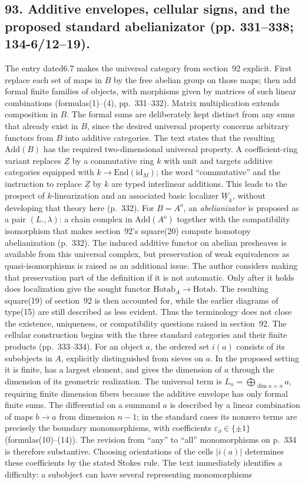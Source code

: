 \documentclass[10pt,oneside]{book}
\begin{document}
\subsection*{93. Additive envelopes, cellular signs, and the proposed standard abelianizator (pp. 331--338; 134-6/12--19).}
The entry dated6.7 makes the universal category from section~92 explicit. First replace each set of maps in $B$ by the free abelian group on those maps; then add formal finite families of objects, with morphisms given by matrices of such linear combinations (formulas(1)--(4), pp.~331--332). Matrix multiplication extends composition in $B$. The formal sums are deliberately kept distinct from any sums that already exist in $B$, since the desired universal property concerns arbitrary functors from $B$ into additive categories. The text states that the resulting $\mathrm{Add}(B)$ has the required two-dimensional universal property. A coefficient-ring variant replaces $\underline Z$ by a commutative ring $k$ with unit and targets additive categories equipped with $k\to\mathrm{End}(\mathrm{id}_M)$; the word ``commutative'' and the instruction to replace $\underline Z$ by $k$ are typed interlinear additions. This leads to the prospect of $k$-linearization and an associated basic localizer $\underline W_k$, without developing that theory here (p.~332). For $B=A^o$, an \emph{abelianizator} is proposed as a pair $(L.,\lambda)$: a chain complex in $\mathrm{Add}(A^o)$ together with the compatibility isomorphism that makes section~92's square(20) compute homotopy abelianization (p.~332). The induced additive functor on abelian presheaves is available from this universal complex, but preservation of weak equivalences as quasi-isomorphisms is raised as an additional issue. The author considers making that preservation part of the definition if it is not automatic. Only after it holds does localization give the sought functor $\mathrm{Hotab}_A\to\mathrm{Hotab}$. The resulting square(19) of section~92 is then accounted for, while the earlier diagrams of type(15) are still described as less evident. Thus the terminology does not close the existence, uniqueness, or compatibility questions raised in section~92. The cellular construction begins with the three standard categories and their finite products (pp.~333--334). For an object $a$, the ordered set $i(a)$ consists of its subobjects in $A$, explicitly distinguished from sieves on $a$. In the proposed setting it is finite, has a largest element, and gives the dimension of $a$ through the dimension of its geometric realization. The universal term is $L_n=\bigoplus_{\dim a=n}a$, requiring finite dimension fibers because the additive envelope has only formal finite sums. The differential on a summand $a$ is described by a linear combination of maps $b\to a$ from dimension $n-1$; in the standard cases its nonzero terms are precisely the boundary monomorphisms, with coefficients $\varepsilon_{\partial}\in\{\pm1\}$ (formulas(10)--(14)). The revision from ``any'' to ``all'' monomorphisms on p.~334 is therefore substantive. Choosing orientations of the cells $|i(a)|$ determines these coefficients by the stated Stokes rule. The text immediately identifies a difficulty: a subobject can have several representing monomorphisms 
\end{document}
